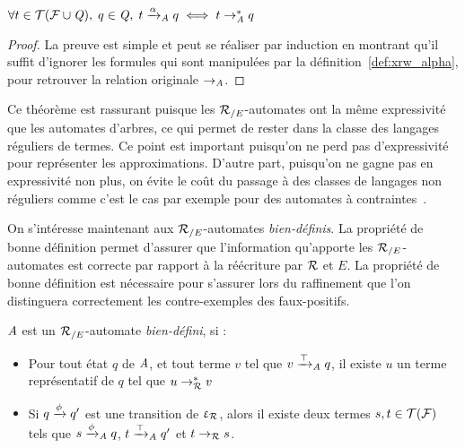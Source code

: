 \begin{theorem}\label{th:equiv}{\quad\quad
  $\forall t\in\mathcal{ T(F \cup \mathit Q)},\; q \in \mathit Q,\; t \xrightarrow{\alpha}_\mathit A q \; \Longleftrightarrow \; t \rightarrow_\mathit A^* q$}
\end{theorem}

\begin{proof}
  La preuve est simple et peut se réaliser par induction en montrant qu'il suffit
  d'ignorer les formules qui sont manipulées par la définition~\ref{def:xrw_alpha},
  pour retrouver la relation originale $\rightarrow_\mathit A$. 
\end{proof}

Ce théorème est rassurant puisque les ${\mathcal R_{/E}}$-automates ont la même expressivité
que les automates d'arbres, ce qui permet de rester dans la classe des langages réguliers
de termes. Ce point est important puisqu'on ne perd pas d'expressivité pour représenter les
approximations. D'autre part, puisqu'on ne gagne pas en expressivité
non plus, on évite le coût du passage à des classes de langages non réguliers
comme c'est le cas par exemple pour des automates à contraintes~\cite{TATA}.


On s'intéresse maintenant aux ${\mathcal R_{/E}}$-automates {\em bien-définis}. 
La propriété de bonne définition permet d'assurer que l'information
qu'apporte les ${\mathcal R_{/E}}$-automates est correcte par rapport à la réécriture
par $\mathcal R$ et $E$. La propriété de bonne définition est nécessaire pour s'assurer 
lors du raffinement que l'on distinguera correctement les contre-exemples des faux-positifs.


\begin{definition}
  \label{def:well-defined}
  $\mathit A$ est un ${\mathcal R_{/E}}$-automate \emph{bien-défini}, si :
  \begin{itemize}
  \item Pour tout état $q$ de $\mathit A$, et tout terme $v$ tel que
    $v \xrightarrow{\top}_\mathit A q$, il existe $u$ un terme représentatif
    de $q$ tel que $u \rightarrow^*_\mathcal R v$
  \item Si $q \xrightarrow{\phi} q'$ est une transition de $\upvarepsilon_{\mathcal R}$, alors il existe deux termes
    $s,t\in \mathcal{T(F)}$ tels que $s\xrightarrow{\phi}_\mathit A q$, $t\xrightarrow{\top}_\mathit A q'$
    et $t \rightarrow_\mathcal R s$.
  \end{itemize}
\end{definition}

